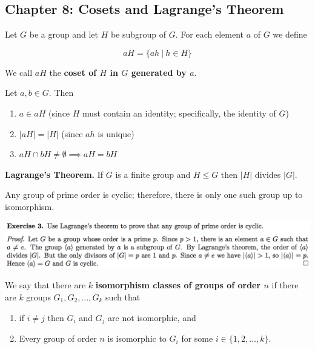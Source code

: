 \documentclass{article}
\begin{document}
\pagebreak
\subsection{Chapter 8: Cosets and Lagrange's Theorem}

Let \(G\) be a group and let \(H\) be subgroup of \(G\). For each element \(a\) of \(G\) we define

\[
aH = \{ ah \ | \ h \in H\}
\]

We call \(aH\) the \textbf{coset of \(H\) in \(G\) generated by \(a\)}.

Let \(a, b \in G\). Then

\begin{enumerate}[1.]

\item \(a \in aH\) (since \(H\) must contain an identity; specifically, the identity of \(G\))

\item \(|aH| = |H|\) (since \(ah\) is unique)

\item \(aH \cap bH \neq  \emptyset \implies aH = bH\)

\end{enumerate}

\textbf{Lagrange's Theorem.} If \(G\) is a finite group and \(H \leq G\) then \(|H|\) divides \(|G|\).

Any group of prime order is cyclic; therefore, there is only one such group up to isomorphism.

\includegraphics[scale=0.45]{prime_order}

We say that there are \(k\) \textbf{isomorphism classes of groups of order \(n\)} if there are \(k\) groups \(G_1, G_2, \ldots, G_k\) such that

\begin{enumerate}[1.]

\item if \(i \neq j\) then \(G_i\) and \(G_j\) are not isomorphic, and

\item Every group of order \(n\) is isomorphic to \(G_i\) for some \(i \in \{1, 2, \ldots, k\}\).

\end{enumerate}
\end{document}

